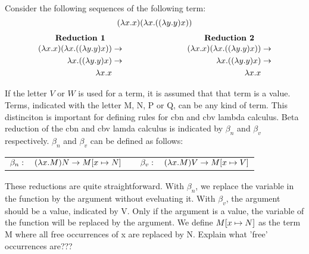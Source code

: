 Consider the following \br sequences of the following term:
\[(\lambda x. x)(\lambda x. ((\lambda y. y) x))\]
\[
	\begin{array}{c c}
		\parbox[c]{0.5\textwidth}{\centering \textbf{Reduction 1}} & \parbox[c]{0.5\textwidth}{\centering \textbf{Reduction 2}} \\
		\vspace{-10pt}                                                                                                          \\
		\begin{aligned}
			(\lambda x. x)(\lambda x. ((\lambda y. y) x)) & \rightarrow \\
			\lambda x. ((\lambda y. y) x)                 & \rightarrow \\
			\lambda x. x
		\end{aligned}
		                                                           &
		\begin{aligned}
			(\lambda x. x)(\lambda x. ((\lambda y. y) x)) & \rightarrow \\
			\lambda x. ((\lambda y. y) x)                 & \rightarrow \\
			\lambda x. x
		\end{aligned}
	\end{array}
\]

\vspace{10pt}
If the letter $V$ or $W$ is used for a term, it is assumed that that term is a value.
Terms, indicated with the letter M, N, P or Q, can be any kind of term.
This distinciton is important for defining \br rules for cbn and cbv lambda calculus.
Beta reduction of the cbn and cbv lamda calculus is indicated by $\beta_n$ and $\beta_v$ respectively.
$\beta_n$ and $\beta_v$ can be defined as follows:

\vspace{10pt}
\begin{tabular}{c c}
	$\beta_n: \quad (\lambda x.M) N \rightarrow M[{x}\mapsto{N}]$ &
	$\quad \beta_v: \quad (\lambda x.M) V \rightarrow M[{x}\mapsto{V}]$
\end{tabular}

\vspace{10pt}
These reductions are quite straightforward. With $\beta_n$, we replace the variable in the function by the argument without eveluating it.
With $\beta_v$, the argument should be a value, indicated by V. Only if the argument is a value, the variable of the function will be replaced by the argument.
We define $M[{x}\mapsto{N}]$ as the term M where all free occurrences of x are replaced by N.
Explain what 'free' occurrences are???


